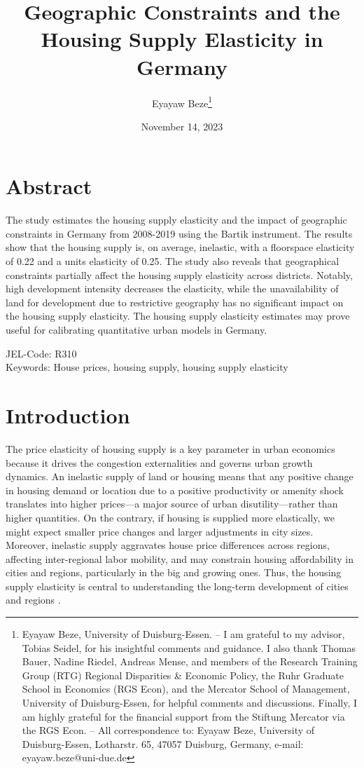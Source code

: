 \documentclass[
  12pt,
]{article}
\title{\textbf{Geographic Constraints and the Housing Supply Elasticity in Germany}}
\subtitle{\begin{center}
\href{https://uni-duisburg-essen.sciebo.de/s/km7tQzcygRQjwp6}{Click here for the latest version.}
\end{center}}
\author{Eyayaw Beze\footnote{Eyayaw Beze, University of Duisburg-Essen. -- I am grateful to my advisor, Tobias Seidel, for his insightful comments and guidance. I also thank Thomas Bauer, Nadine Riedel, Andreas Mense, and members of the Research Training Group (RTG) Regional Disparities \& Economic Policy, the Ruhr Graduate School in Economics (RGS Econ), and the Mercator School of Management, University of Duisburg-Essen, for helpful comments and discussions. Finally, I am highly grateful for the financial support from the Stiftung Mercator via the RGS Econ. -- All correspondence to: Eyayaw Beze, University of Duisburg-Essen, Lotharstr. 65, 47057 Duisburg, Germany, e-mail: eyayaw.beze@uni-due.de}}
\date{November 14, 2023}
\begin{document}
\maketitle





\section*{Abstract}\label{abstract}

The study estimates the housing supply elasticity and the impact of geographic constraints in Germany from 2008-2019 using the Bartik instrument. The results show that the housing supply is, on average, inelastic, with a floorspace elasticity of 0.22 and a units elasticity of 0.25. The study also reveals that geographical constraints partially affect the housing supply elasticity across districts. Notably, high development intensity decreases the elasticity, while the unavailability of land for development due to restrictive geography has no significant impact on the housing supply elasticity. The housing supply elasticity estimates may prove useful for calibrating quantitative urban models in Germany.

JEL-Code: R310\\
Keywords: House prices, housing supply, housing supply elasticity

\pagebreak

\section{Introduction}\label{introduction}


The price elasticity of housing supply is a key parameter in urban economics because it drives the congestion externalities and governs urban growth dynamics. An inelastic supply of land or housing means that any positive change in housing demand or location due to a positive productivity or amenity shock translates into higher prices---a major source of urban disutility---rather than higher quantities. On the contrary, if housing is supplied more elastically, we might expect smaller price changes and larger adjustments in city sizes. Moreover, inelastic supply aggravates house price differences across regions, affecting inter-regional labor mobility, and may constrain housing affordability in cities and regions, particularly in the big and growing ones. Thus, the housing supply elasticity is central to understanding the long-term development of cities and regions \citep{combes-etal2019, glaeser-etal2006, saks2008, lerbs2014}.
\end{document}
